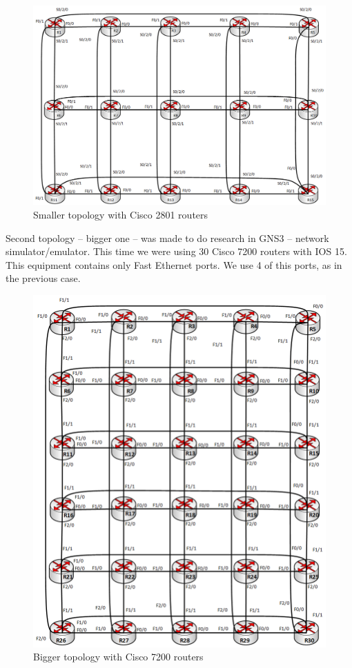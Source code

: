 \documentclass[conference,compsoc]{IEEEtran}
\begin{document}
\begin{figure}[!h]
  \begin{center}
    \includegraphics[width=\columnwidth]{images/f1}
  \end{center}
  \caption{Smaller topology with Cisco 2801 routers}
\end{figure}

Second topology – bigger one – was made to do research in GNS3 – network simulator/emulator. This time we were using 30 Cisco 7200 routers with IOS 15. This equipment contains only Fast Ethernet ports. We use 4 of this ports, as in the previous case.


\begin{figure}[!h]
  \centering
  \includegraphics[width=\columnwidth]{images/f2}
  \caption{Bigger topology with Cisco 7200 routers}
\end{figure}
\end{document}
